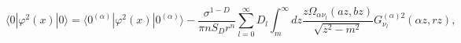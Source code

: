 \begin{equation}\label{fieldsqform1}
  \langle 0|\varphi ^{2}(x)|0\rangle =\langle 0^{(\alpha )}|
  \varphi ^{2}(x)|0^{(\alpha )}\rangle
  -\frac{\sigma ^{1-D}}{\pi nS_{D}r^{n}}\sum_{l=0}^{\infty }
  D_{l}\int_{m}^{\infty }dz\frac{z\Omega _{\alpha \nu _l}(a z,
  b z)}{\sqrt{z^{2}-m^{2}}}G_{\nu _l}^{(\alpha )2}(\alpha z,r z),
\end{equation}


